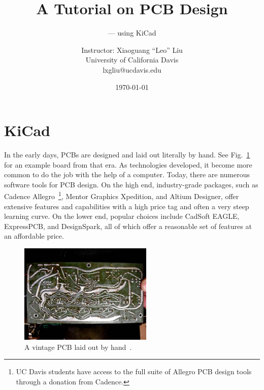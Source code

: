 \documentclass[12pt,letterpaper]{scrartcl}
\title{A Tutorial on PCB Design}
\subtitle{--- using KiCad}
\author{Instructor: Xiaoguang ``Leo'' Liu \\University of California Davis \\ lxgliu@ucdavis.edu}
\date{\today}
\begin{document}
\maketitle

\tableofcontents

\newpage


\section{KiCad}
In the early days, PCBs are designed and laid out literally by hand. See Fig.~\ref{fig:hand-pcb} for an example board from that era. As technologies developed, it become more common to do the job with the help of a computer. Today, there are numerous software tools for PCB design. On the high end, industry-grade packages, such as Cadence Allegro~\footnote{UC Davis students have access to the full suite of Allegro PCB design tools through a donation from Cadence.}, Mentor Graphics Xpedition, and Altium Designer, offer extensive features and capabilities with a high price tag and often a very steep learning curve. On the lower end, popular choices include CadSoft EAGLE, ExpressPCB, and DesignSpark, all of which offer a reasonable set of features at an affordable price. 

\begin{figure}[ht]
\centering
\includegraphics[width=2.5in]{hand-pcb.jpg}
\caption{A vintage PCB laid out by hand~\cite{hand-pcb}.}
\label{fig:hand-pcb}
\end{figure}
\end{document}
